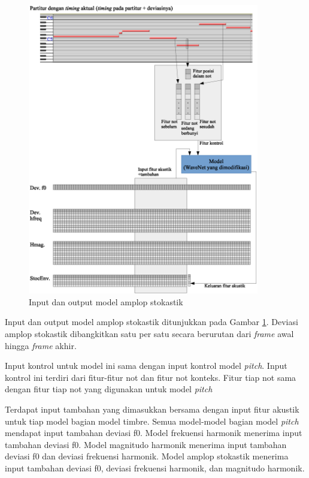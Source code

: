 \begin{figure}[htbp]
    \centering
    \includegraphics[width=0.9\textwidth]{resources/stocenv-model-in-out.eps}
    \caption{Input dan output model amplop stokastik}\label{fig-stocenv-model-in-out}
\end{figure}

Input dan output model amplop stokastik ditunjukkan pada Gambar \ref{fig-stocenv-model-in-out}. Deviasi amplop stokastik dibangkitkan satu per satu secara berurutan dari \textit{frame} awal hingga \textit{frame} akhir.

Input kontrol untuk model ini sama dengan input kontrol model \textit{pitch}. Input kontrol ini terdiri dari fitur-fitur not dan fitur not konteks. Fitur tiap not sama dengan fitur tiap not yang digunakan untuk model \textit{pitch}

Terdapat input tambahan yang dimasukkan bersama dengan input fitur akustik untuk tiap model bagian model timbre. Semua model-model bagian model \textit{pitch} mendapat input tambahan deviasi f0. Model frekuensi harmonik menerima input tambahan deviasi f0. Model magnitudo harmonik menerima input tambahan deviasi f0 dan deviasi frekuensi harmonik. Model amplop stokastik menerima input tambahan deviasi f0, deviasi frekuensi harmonik, dan magnitudo harmonik.

